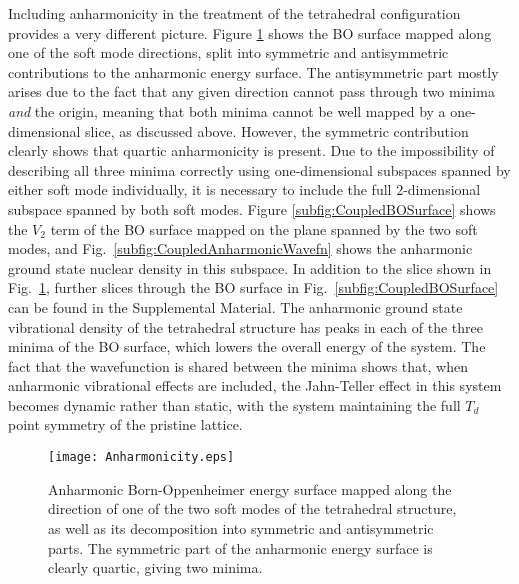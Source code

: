 \documentclass[aps,showpacs,prb,reprint,superscriptaddress,longbibliography]{revtex4-1}
\begin{document}
Including anharmonicity in the treatment of the tetrahedral
configuration provides a very different picture.  Figure
\ref{fig:QuarticAnh} shows the BO surface mapped along one of the soft
mode directions, split into symmetric and antisymmetric contributions
to the anharmonic energy surface. The antisymmetric part mostly arises
due to the fact that any given direction cannot pass through two
minima \textit{and} the origin, meaning that both minima cannot be
well mapped by a one-dimensional slice, as discussed above.  However,
the symmetric contribution clearly shows that quartic anharmonicity is
present.  Due to the impossibility of describing all three minima
correctly using one-dimensional subspaces spanned by either soft mode
individually, it is necessary to include the full $2$-dimensional
subspace spanned by both soft modes.  Figure
\ref{subfig:CoupledBOSurface} shows the $V_2$ term of the BO surface
mapped on the plane spanned by the two soft modes, and Fig.\
\ref{subfig:CoupledAnharmonicWavefn} shows the anharmonic ground state
nuclear density in this subspace. In addition to the slice shown in
Fig.\ \ref{fig:QuarticAnh}, further slices through the BO surface in
Fig.\ \ref{subfig:CoupledBOSurface} can be found in the Supplemental
Material.  The anharmonic ground state vibrational density of the
tetrahedral structure has peaks in each of the three minima of the BO
surface, which lowers the overall energy of the system. The fact that
the wavefunction is shared between the minima shows that, when
anharmonic vibrational effects are included, the Jahn-Teller effect in
this system becomes dynamic rather than static, with the system
maintaining the full $T_d$ point symmetry of the pristine lattice.

\begin{figure}
\begin{center}
\texttt{[image: Anharmonicity.eps]}
\end{center}
\caption{Anharmonic Born-Oppenheimer energy surface mapped along the direction of one
  of the two soft modes of the tetrahedral structure, as well as its decomposition into
  symmetric and antisymmetric parts. The symmetric part of the anharmonic energy surface 
  is clearly quartic, giving two minima.}
\label{fig:QuarticAnh}
\end{figure}
\end{document}
